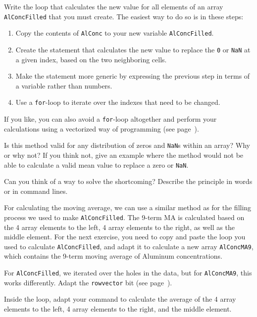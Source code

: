 Write the loop that calculates the new value for all elements of an array {\tt AlConcFilled} that you must create. The easiest way to do so is in these steps:
\begin{enumerate}
\item Copy the contents of {\tt AlConc} to your new variable {\tt AlConcFilled}.
\item Create the statement that calculates the new value to replace the {\tt 0} or {\tt NaN} at a given index, based on the two neighboring cells. 
\item Make the statement more generic by expressing the previous step in terms of a variable rather than numbers.
\item Use a {\tt for}-loop to iterate over the indexes that need to be changed.
\end{enumerate}
If you like, you can also avoid a {\tt for}-loop altogether and perform your calculations using a vectorized way of programming (see page~\pageref{ind:vectorization}).
\begin{action}
Is this method valid for any distribution of zeros and {\tt NaN}s within an array? Why or why not? If you think not, give an example where the method would not be able to calculate a valid mean value to replace a zero or {\tt NaN}.
\end{action}
\begin{action}
Can you think of a way to solve the shortcoming? Describe the principle in words or in command lines.
\end{action}
For calculating the moving average, we can use a similar method as for the filling process we used to make {\tt AlConcFilled}. The 9-term MA is calculated based on the 4 array elements to the left, 4 array elements to the right, as well as the middle element. For the next exercise, you need to copy and paste the loop you used to calculate {\tt AlConcFilled}, and adapt it to calculate a new array {\tt AlConcMA9}, which contains the 9-term moving average of Aluminum concentrations.
\begin{action}
For {\tt AlConcFilled}, we iterated over the holes in the data, but for {\tt AlConcMA9}, this works differently. Adapt the {\tt rowvector} bit (see page~\pageref{ind:rowvector}).
\end{action}
\begin{action}
Inside the loop, adapt your command to calculate the average of the 4 array elements to the left, 4 array elements to the right, and the middle element.
\end{action}
